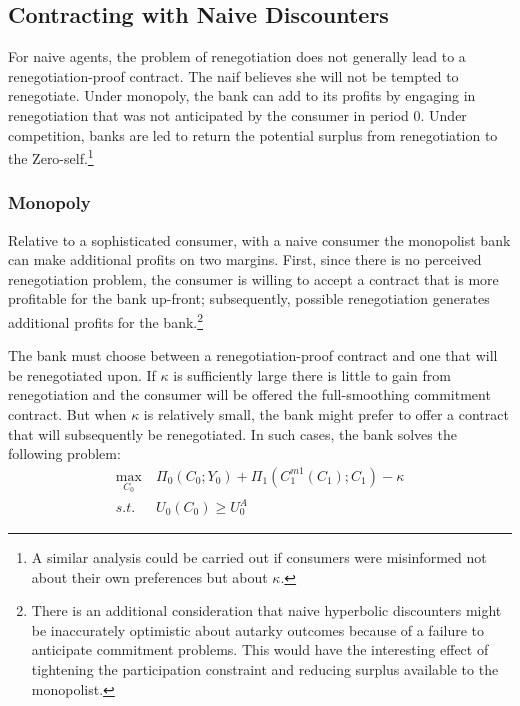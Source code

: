 \documentclass[11pt,english]{article}
\theoremstyle{plain}
\theoremstyle{definition}
\begin{document}
\subsection{Contracting with Naive Discounters}

For naive agents, the problem of renegotiation does not generally
lead to a renegotiation-proof contract. The naif believes she will
not be tempted to renegotiate.  Under monopoly, the
bank can add to its profits by engaging in renegotiation that was not
anticipated by the consumer in period 0. Under competition, banks
are led to return the potential surplus from renegotiation to the Zero-self.\footnote{A similar analysis could be carried out if consumers were misinformed
not about their own preferences but about $\kappa$.}

\subsubsection{Monopoly}

Relative to a sophisticated consumer, with a naive consumer the monopolist
bank can make additional profits on two margins. First, since there
is no perceived renegotiation problem, the consumer is willing to
accept a contract that is more profitable for the bank up-front; subsequently,
possible renegotiation generates additional profits for the bank.\footnote{There is an additional consideration \textendash{} that naive hyperbolic
discounters might be inaccurately optimistic about autarky outcomes
because of a failure to anticipate commitment problems. This would
have the interesting effect of tightening the participation constraint
and reducing surplus available to the monopolist.}

The bank must choose between a renegotiation-proof contract and one
that will be renegotiated upon. If $\kappa$ is sufficiently large
there is little to gain from renegotiation and the consumer will be
offered the full-smoothing commitment contract. But when $\kappa$
is relatively small, the bank might prefer to offer a contract that
will subsequently be renegotiated. In such cases, the bank solves
the following problem:
\begin{eqnarray}
\underset{C_{0}}{\text{max}} & \ \Pi_{0}\left(C_{0};Y_{0}\right)+\Pi_{1}\left(C_{1}^{m1}\left(C_{1}\right);C_{1}\right)-\kappa\\
s.t. & \ U_{0}\left(C_{0}\right)\geq U_{0}^{A}\label{eq:pc-n}
\end{eqnarray}
\end{document}
